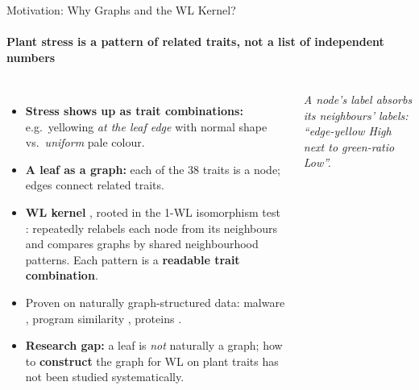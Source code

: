 \documentclass[aspectratio=169, 11pt]{beamer}
\begin{document}
\begin{frame}{Motivation: Why Graphs and the WL Kernel?}
    \framesubtitle{Plant stress is a pattern of related traits, not a list of independent numbers}
    \begin{columns}[c]
        \footnotesize
        \begin{itemize}
            \item \textbf{Stress shows up as trait combinations:} e.g.\ yellowing \emph{at the leaf edge} with normal shape vs.\ \emph{uniform} pale colour.
            \item \textbf{A leaf as a graph:} each of the 38 traits is a node; edges connect related traits.
            \item \textbf{WL kernel} \cite{shervashidze2011weisfeiler}, rooted in the 1-WL isomorphism test \cite{weisfeiler1968reduction}: repeatedly relabels each node from its neighbours and compares graphs by shared neighbourhood patterns. Each pattern is a \textbf{readable trait combination}.
            \item Proven on naturally graph-structured data: malware \cite{narayanan2016contextual}, program similarity \cite{li2016detecting}, proteins \cite{borgwardt2005protein}.
            \item \textbf{Research gap:} a leaf is \emph{not} naturally a graph; how to \textbf{construct} the graph for WL on plant traits has not been studied systematically.
        \end{itemize}

        \centering

        \vspace{0.1cm}
        {\scriptsize\itshape A node's label absorbs its neighbours' labels: ``edge-yellow High next to green-ratio Low''.}
    \end{columns}
\end{frame}
\end{document}
